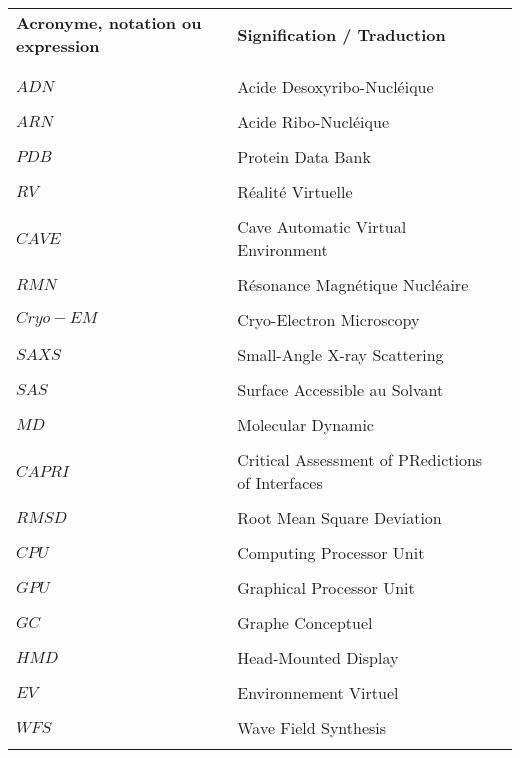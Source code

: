 


\begin{table}[htbp]
\centering
\begin{tabular}{l l l}

\textbf{Acronyme, notation ou expression} & \textbf{Signification / Traduction} & \\ \\ %
\hline
\\
$ADN$ & Acide Desoxyribo-Nucléique & \\  \\
$ARN$ & Acide Ribo-Nucléique & \\  \\
$PDB$ & Protein Data Bank & \\  \\
$RV$ & Réalité Virtuelle & \\  \\
$CAVE$ & Cave Automatic Virtual Environment & \\  \\
$RMN$ & Résonance Magnétique Nucléaire & \\  \\
$Cryo-EM$ & Cryo-Electron Microscopy & \\  \\
$SAXS$ & Small-Angle X-ray Scattering & \\  \\
$SAS$ & Surface Accessible au Solvant & \\  \\
$MD$ & Molecular Dynamic & \\  \\
$CAPRI$ & Critical Assessment of PRedictions of Interfaces & \\  \\
$RMSD$ & Root Mean Square Deviation & \\  \\
$CPU$ & Computing Processor Unit & \\  \\
$GPU$ & Graphical Processor Unit & \\  \\
$GC$ & Graphe Conceptuel & \\  \\
$HMD$ & Head-Mounted Display \\  \\
$EV$ & Environnement Virtuel \\  \\
$WFS$ & Wave Field Synthesis \\  \\

\end{tabular}
\end{table}


